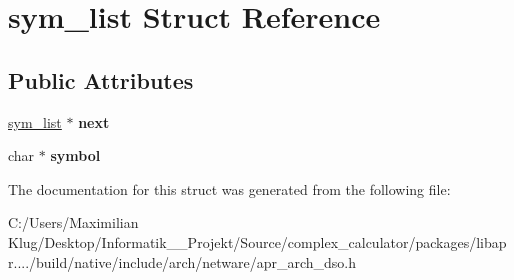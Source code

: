\hypertarget{structsym__list}{}\section{sym\+\_\+list Struct Reference}
\label{structsym__list}
\subsection*{Public Attributes}
\begin{DoxyCompactItemize}
\item 
\mbox{\label{structsym__list_a855ebba82b4ac68081f6e9bc599c4e1b}} 
\mbox{\hyperlink{structsym__list}{sym\+\_\+list}} $\ast$ {\bfseries next}
\item 
\mbox{\label{structsym__list_a1f3e4b6c851ab374a8d527c95abefdf0}} 
char $\ast$ {\bfseries symbol}
\end{DoxyCompactItemize}


The documentation for this struct was generated from the following file\+:\begin{DoxyCompactItemize}
\item 
C\+:/\+Users/\+Maximilian Klug/\+Desktop/\+Informatik\+\_\+\_\+\+Projekt/\+Source/complex\+\_\+calculator/packages/libapr..../build/native/include/arch/netware/apr\+\_\+arch\+\_\+dso.\+h\end{DoxyCompactItemize}
